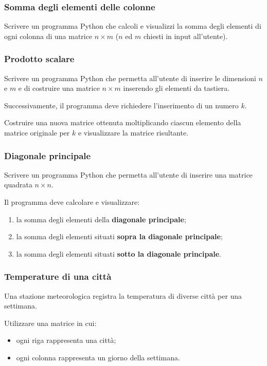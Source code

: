 \documentclass[a4paper,12pt]{article}
\begin{document}
	\subsubsection{Somma degli elementi delle colonne}
	Scrivere un programma Python che calcoli e visualizzi la somma degli elementi di ogni colonna di una matrice $n \times m$ ($n$ ed $m$ chiesti in input all'utente).
	
	\subsubsection{Prodotto scalare}
	Scrivere un programma Python che permetta all'utente di inserire le dimensioni $n$ e $m$ e di costruire una matrice $n \times m$ inserendo gli elementi da tastiera.
	
	Successivamente, il programma deve richiedere l'inserimento di un numero $k$.
	
	Costruire una nuova matrice ottenuta moltiplicando ciascun elemento della matrice originale per $k$ e visualizzare la matrice risultante.
	
	\subsubsection{Diagonale principale}
	
	Scrivere un programma Python che permetta all'utente di inserire una matrice quadrata
	$n \times n$.
	
	Il programma deve calcolare e visualizzare:
	
	\begin{enumerate}
		\item la somma degli elementi della \textbf{diagonale principale};
		\item la somma degli elementi situati \textbf{sopra la diagonale principale};
		\item la somma degli elementi situati \textbf{sotto la diagonale principale}.
	\end{enumerate}
	
	\subsubsection{Temperature di una città}
	Una stazione meteorologica registra la temperatura di diverse città per una settimana.
	
	Utilizzare una matrice in cui:
	\begin{itemize}
		\item ogni riga rappresenta una città;
		\item ogni colonna rappresenta un giorno della settimana.
	\end{itemize}
	
\end{document}
